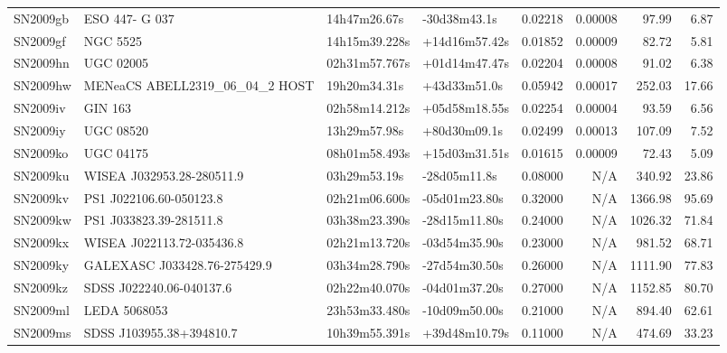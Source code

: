 \begin{longtable}{llllrrrr}
SN2009gb         &                  ESO 447- G 037 &    14h47m26.67s &    -30d38m43.1s &  0.02218 &  0.00008 &    97.99 &        6.87 \\
SN2009gf         &                        NGC 5525 &   14h15m39.228s &   +14d16m57.42s &  0.01852 &  0.00009 &    82.72 &        5.81 \\
SN2009hn         &                       UGC 02005 &   02h31m57.767s &   +01d14m47.47s &  0.02204 &  0.00008 &    91.02 &        6.38 \\
SN2009hw         &  MENeaCS ABELL2319_06_04_2 HOST &    19h20m34.31s &    +43d33m51.0s &  0.05942 &  0.00017 &   252.03 &       17.66 \\
SN2009iv         &                         GIN 163 &   02h58m14.212s &   +05d58m18.55s &  0.02254 &  0.00004 &    93.59 &        6.56 \\
SN2009iy         &                       UGC 08520 &    13h29m57.98s &    +80d30m09.1s &  0.02499 &  0.00013 &   107.09 &        7.52 \\
SN2009ko         &                       UGC 04175 &   08h01m58.493s &   +15d03m31.51s &  0.01615 &  0.00009 &    72.43 &        5.09 \\
SN2009ku         &       WISEA J032953.28-280511.9 &    03h29m53.19s &    -28d05m11.8s &  0.08000 &      N/A &   340.92 &       23.86 \\
SN2009kv         &         PS1 J022106.60-050123.8 &   02h21m06.600s &   -05d01m23.80s &  0.32000 &      N/A &  1366.98 &       95.69 \\
SN2009kw         &         PS1 J033823.39-281511.8 &   03h38m23.390s &   -28d15m11.80s &  0.24000 &      N/A &  1026.32 &       71.84 \\
SN2009kx         &       WISEA J022113.72-035436.8 &   02h21m13.720s &   -03d54m35.90s &  0.23000 &      N/A &   981.52 &       68.71 \\
SN2009ky         &  GALEXASC J033428.76-275429.9   &   03h34m28.790s &   -27d54m30.50s &  0.26000 &      N/A &  1111.90 &       77.83 \\
SN2009kz         &        SDSS J022240.06-040137.6 &   02h22m40.070s &   -04d01m37.20s &  0.27000 &      N/A &  1152.85 &       80.70 \\
SN2009ml         &                    LEDA 5068053 &   23h53m33.480s &   -10d09m50.00s &  0.21000 &      N/A &   894.40 &       62.61 \\
SN2009ms         &        SDSS J103955.38+394810.7 &   10h39m55.391s &   +39d48m10.79s &  0.11000 &      N/A &   474.69 &       33.23 \\

\end{longtable}
